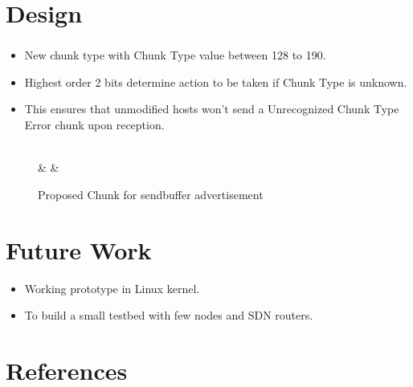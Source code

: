 \documentclass{beamer}
\begin{document}
\section{Design}
\begin{frame}[fragile]
\frametitle{\insertsection}
\begin{itemize}
\item New chunk type with Chunk Type value between 128 to 190.
\item Highest order 2 bits determine action to be taken if Chunk Type is
	unknown.
\item This ensures that unmodified hosts won't send a
	Unrecognized Chunk Type Error chunk upon reception.
\end{itemize}

\begin{figure}[h]
	\centering
	\begin{bytefield}{32}
	\\
	 &  & \\
	\end{bytefield}
	\caption{Proposed Chunk for sendbuffer advertisement}
\end{figure}
\end{frame}

\section{Future Work}
\begin{frame}{\insertsection}
\begin{itemize}
\item Working prototype in Linux kernel.
\item To build a small testbed with few nodes and SDN routers.
\end{itemize}
\end{frame}

\section{References}
\begin{frame}[allowframebreaks]
\frametitle<presentation>{\insertsection}
\printbibliography
\end{frame}
\end{document}
